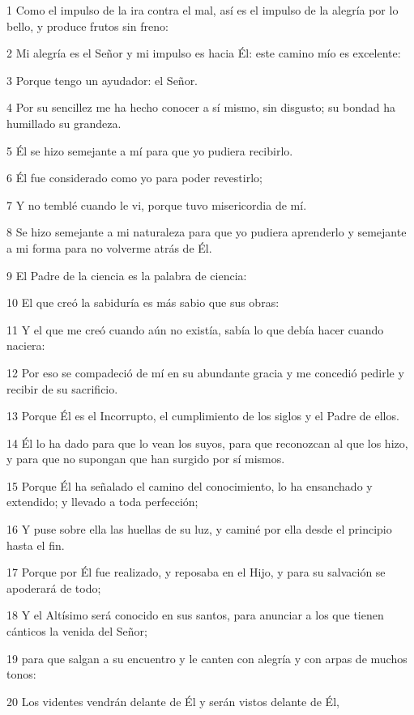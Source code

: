 \par 1 Como el impulso de la ira contra el mal, así es el impulso de la alegría por lo bello, y produce frutos sin freno:
\par 2 Mi alegría es el Señor y mi impulso es hacia Él: este camino mío es excelente:
\par 3 Porque tengo un ayudador: el Señor.
\par 4 Por su sencillez me ha hecho conocer a sí mismo, sin disgusto; su bondad ha humillado su grandeza.
\par 5 Él se hizo semejante a mí para que yo pudiera recibirlo.
\par 6 Él fue considerado como yo para poder revestirlo;
\par 7 Y no temblé cuando le vi, porque tuvo misericordia de mí.
\par 8 Se hizo semejante a mi naturaleza para que yo pudiera aprenderlo y semejante a mi forma para no volverme atrás de Él.
\par 9 El Padre de la ciencia es la palabra de ciencia:
\par 10 El que creó la sabiduría es más sabio que sus obras:
\par 11 Y el que me creó cuando aún no existía, sabía lo que debía hacer cuando naciera:
\par 12 Por eso se compadeció de mí en su abundante gracia y me concedió pedirle y recibir de su sacrificio.
\par 13 Porque Él es el Incorrupto, el cumplimiento de los siglos y el Padre de ellos.
\par 14 Él lo ha dado para que lo vean los suyos, para que reconozcan al que los hizo, y para que no supongan que han surgido por sí mismos.
\par 15 Porque Él ha señalado el camino del conocimiento, lo ha ensanchado y extendido; y llevado a toda perfección;
\par 16 Y puse sobre ella las huellas de su luz, y caminé por ella desde el principio hasta el fin.
\par 17 Porque por Él fue realizado, y reposaba en el Hijo, y para su salvación se apoderará de todo;
\par 18 Y el Altísimo será conocido en sus santos, para anunciar a los que tienen cánticos la venida del Señor;
\par 19 para que salgan a su encuentro y le canten con alegría y con arpas de muchos tonos:
\par 20 Los videntes vendrán delante de Él y serán vistos delante de Él,
